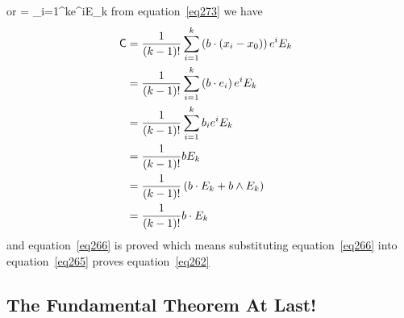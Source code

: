 or
\be
\Delta{} = \sum_{i=1}^{k}e^{i}E_{k}
\ee
from equation~\ref{eq273} we have
\begin{align}
\hspace{-0.5in}\mathsf{C} & = \bfrac{1}{\paren{k-1}!}\sum_{i=1}^{k} 
                                \paren{b\cdot\paren{x_{i}-x_{0}}}e^{i}E_{k} \nonumber \\
                          & = \bfrac{1}{\paren{k-1}!}\sum_{i=1}^{k}\paren{b\cdot e_{i}}e^{i}E_{k} \nonumber \\
                          & = \bfrac{1}{\paren{k-1}!}\sum_{i=1}^{k}b_{i}e^{i}E_{k} \nonumber \\
                          & = \bfrac{1}{\paren{k-1}!}bE_{k} \nonumber \\
                          & = \bfrac{1}{\paren{k-1}!}\paren{b\cdot E_{k}+ b\w E_{k}} \nonumber \\
                          & = \bfrac{1}{\paren{k-1}!}b\cdot E_{k} 
\end{align}
and equation~\ref{eq266} is proved which means substituting equation~\ref{eq266} into equation~\ref{eq265} proves equation~\ref{eq262}

\subsection{The Fundamental Theorem At Last!}

